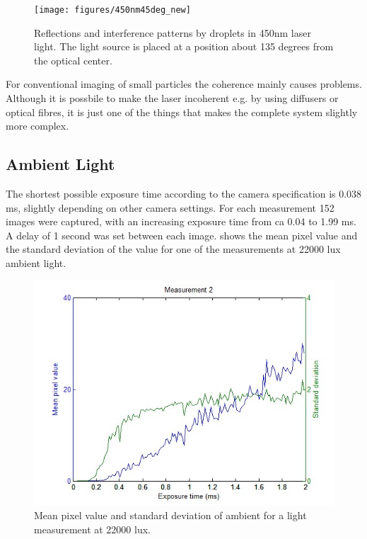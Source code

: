 \begin{figure}%
\centering\texttt{[image: figures/450nm45deg\_new]}
\caption{Reflections and interference patterns by droplets in 450nm laser light. The light source is placed at a position about 135 degrees from the optical center.}
\label{fig:laser}
\end{figure}

For conventional imaging of small particles the coherence mainly causes problems. Although it is possbile to make the laser incoherent e.g. by using diffusers or optical fibres, it is just one of the things that makes the complete system slightly more complex.
%
%
%

\subsection{Ambient Light}

The shortest possible exposure time according to the camera specification is 0.038 ms, slightly depending on other camera settings. For each measurement 152 images were captured, with an increasing exposure time from ca 0.04 to 1.99 ms. A delay of 1 second was set between each image.  shows the mean pixel value and the standard deviation of the value for one of the measurements at 22000 lux ambient light.

\begin{figure}%
\centering\includegraphics[width=0.6\linewidth]{figures/Amblight22000lux}
\caption{Mean pixel value and standard deviation of ambient for a light measurement at 22000 lux.}
\label{fig:ambientlight}
\end{figure}

